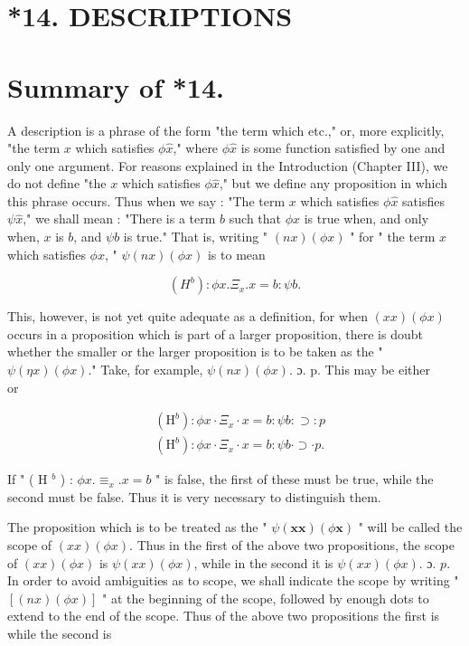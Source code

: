 \documentclass[10pt]{article}
\begin{document}
\section*{*14. DESCRIPTIONS}
\section*{Summary of *14.}
A description is a phrase of the form "the term which etc.," or, more explicitly, "the term $x$ which satisfies $\phi \hat{x}$," where $\phi \hat{x}$ is some function satisfied by one and only one argument. For reasons explained in the Introduction (Chapter III), we do not define "the $x$ which satisfies $\phi \hat{x}$," but we define any proposition in which this phrase occurs. Thus when we say : "The term $x$ which satisfies $\phi \hat{x}$ satisfies $\psi \hat{x}$," we shall mean : "There is a term $b$ such that $\phi x$ is true when, and only when, $x$ is $b$, and $\psi b$ is true." That is, writing " $(n x)(\phi x)$ " for " the term $x$ which satisfies $\phi x$, " $\psi(n x)(\phi x)$ is to mean

$$
\left(H^{b}\right): \phi x . \Xi_{x} . x=b: \psi b .
$$

This, however, is not yet quite adequate as a definition, for when $(x x)(\phi x)$ occurs in a proposition which is part of a larger proposition, there is doubt whether the smaller or the larger proposition is to be taken as the " $\psi(\eta x)(\phi x)$." Take, for example, $\psi(n x)(\phi x)$. ɔ. p. This may be either\\
or

$$
\begin{aligned}
& \left(\mathrm{H}^{b}\right): \phi x \cdot \Xi_{x} \cdot x=b: \psi b: \supset: p \\
& \left(\mathrm{H}^{b}\right): \phi x \cdot \Xi_{x} \cdot x=b: \psi b \cdot \supset \cdot p .
\end{aligned}
$$

If " ( H $^{b}$ ) : $\phi x . \equiv_{x} . x=b$ " is false, the first of these must be true, while the second must be false. Thus it is very necessary to distinguish them.

The proposition which is to be treated as the " $\psi(\boldsymbol{x} \boldsymbol{x})(\phi \boldsymbol{x})$ " will be called the scope of $(x x)(\phi x)$. Thus in the first of the above two propositions, the scope of $(x x)(\phi x)$ is $\psi(x x)(\phi x)$, while in the second it is $\psi(x x)(\phi x)$. ɔ. $p$. In order to avoid ambiguities as to scope, we shall indicate the scope by writing " $[(n x)(\phi x)]$ " at the beginning of the scope, followed by enough dots to extend to the end of the scope. Thus of the above two propositions the first is\\
while the second is
\end{document}
